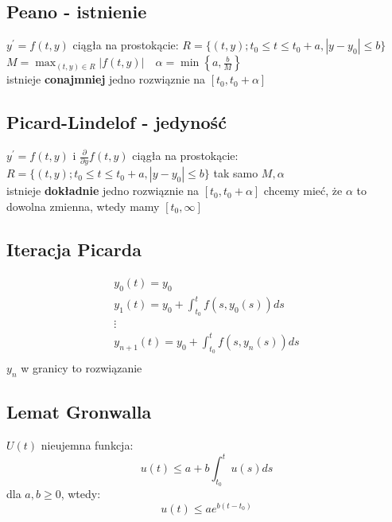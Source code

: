 \documentclass{article}
\begin{document}
\subsection*{Peano - istnienie}
$y^\prime = f(t,y)$ ciągła na prostokącie: $R = \{(t,y); t_0 \leq t \leq t_0 +a, |y-y_0| \leq b\}$\\
$M = \max_{(t,y) \in R}|f(t,y)| \quad \alpha = \min \left\{a,\frac{b}{M}\right\}$ \\
istnieje \textbf{conajmniej} jedno rozwiąznie na $[t_0,t_0+\alpha]$
\subsection*{Picard-Lindelof - jedyność}
$y^\prime = f(t,y)$ i $\frac{\partial}{\partial y} f(t,y)$ ciągła na prostokącie:\\
$R = \{(t,y); t_0 \leq t \leq t_0 +a, |y-y_0| \leq b\}$ tak samo $M,\alpha$\\
istnieje \textbf{dokładnie} jedno rozwiąznie na $[t_0,t_0+\alpha]$ chcemy mieć, że $\alpha$ to dowolna zmienna, wtedy mamy $[t_0,\infty]$
\subsection*{Iteracja Picarda}
\begin{align*}
y_0(t) = y_0\\
y_1(t) = y_0 + \int_{t_0}^t f(s,y_0(s))ds\\
\vdots\\
y_{n+1}(t) = y_0 + \int_{t_0}^t f(s,y_n(s))ds\\
\end{align*}
$y_n$ w granicy to rozwiązanie
\subsection*{Lemat Gronwalla}
$U(t)$ nieujemna funkcja:
$$
u(t) \leq a+ b\int_{t_0}^t u(s)ds
$$
dla $a,b \geq 0$, wtedy:
$$
u(t) \leq ae^{b(t-t_0)}
$$
\end{document}
